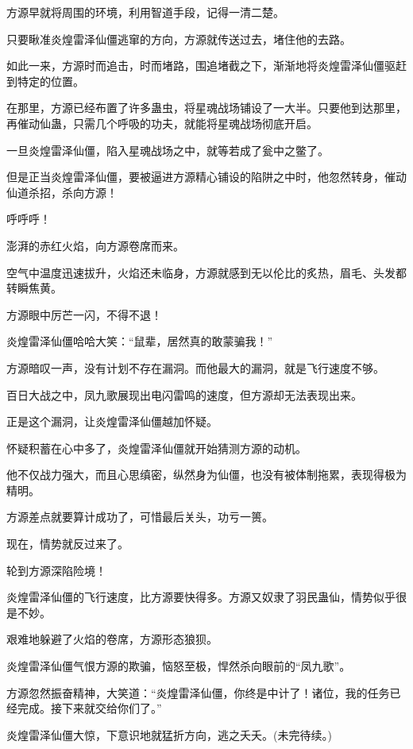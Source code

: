 \begin{this_body}
方源早就将周围的环境，利用智道手段，记得一清二楚。

只要瞅准炎煌雷泽仙僵逃窜的方向，方源就传送过去，堵住他的去路。

如此一来，方源时而追击，时而堵路，围追堵截之下，渐渐地将炎煌雷泽仙僵驱赶到特定的位置。

在那里，方源已经布置了许多蛊虫，将星魂战场铺设了一大半。只要他到达那里，再催动仙蛊，只需几个呼吸的功夫，就能将星魂战场彻底开启。

一旦炎煌雷泽仙僵，陷入星魂战场之中，就等若成了瓮中之鳖了。

但是正当炎煌雷泽仙僵，要被逼进方源精心铺设的陷阱之中时，他忽然转身，催动仙道杀招，杀向方源！

呼呼呼！

澎湃的赤红火焰，向方源卷席而来。

空气中温度迅速拔升，火焰还未临身，方源就感到无以伦比的炙热，眉毛、头发都转瞬焦黄。

方源眼中厉芒一闪，不得不退！

炎煌雷泽仙僵哈哈大笑：“鼠辈，居然真的敢蒙骗我！”

方源暗叹一声，没有计划不存在漏洞。而他最大的漏洞，就是飞行速度不够。

百日大战之中，凤九歌展现出电闪雷鸣的速度，但方源却无法表现出来。

正是这个漏洞，让炎煌雷泽仙僵越加怀疑。

怀疑积蓄在心中多了，炎煌雷泽仙僵就开始猜测方源的动机。

他不仅战力强大，而且心思缜密，纵然身为仙僵，也没有被体制拖累，表现得极为精明。

方源差点就要算计成功了，可惜最后关头，功亏一篑。

现在，情势就反过来了。

轮到方源深陷险境！

炎煌雷泽仙僵的飞行速度，比方源要快得多。方源又奴隶了羽民蛊仙，情势似乎很是不妙。

艰难地躲避了火焰的卷席，方源形态狼狈。

炎煌雷泽仙僵气恨方源的欺骗，恼怒至极，悍然杀向眼前的“凤九歌”。

方源忽然振奋精神，大笑道：“炎煌雷泽仙僵，你终是中计了！诸位，我的任务已经完成。接下来就交给你们了。”

炎煌雷泽仙僵大惊，下意识地就猛折方向，逃之夭夭。(未完待续。)

\end{this_body}

